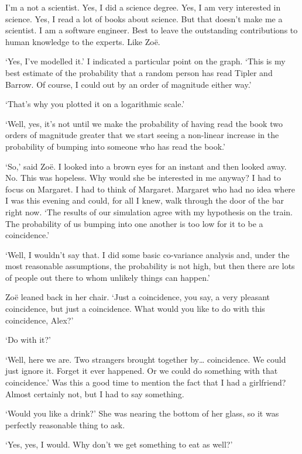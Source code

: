 I'm a not a scientist. Yes, I did a science degree. Yes, I am very
interested in science. Yes, I read a lot of books about science. But
that doesn't make me a scientist. I am a software engineer. Best to
leave the outstanding contributions to human knowledge to the
experts. Like Zoë.

`Yes, I've modelled it.' I indicated a particular point on the
graph. `This is my best estimate of the probability that a random
person has read Tipler and Barrow. Of course, I could out by an
order of magnitude either way.'

`That's why you plotted it on a logarithmic scale.'

`Well, yes, it's not until we make the probability of having read
the book two orders of magnitude greater that we start seeing a
non-linear increase in the probability of bumping into someone who
has read the book.'

`So,' said Zoë. I looked into a brown eyes for an instant and
then looked away. No. This was hopeless. Why would she be interested
in me anyway? I had to focus on Margaret. I had to think of
Margaret. Margaret who had no idea where I was this evening and could, for all I knew, walk through the door of the bar right now. `The results of our simulation agree with my hypothesis on the train. The probability of us bumping into one another is too low for it to be a coincidence.'

`Well, I wouldn't say that. I did some basic co-variance analysis
and, under the most reasonable assumptions, the probability is not
high, but then there are lots of people out there to whom unlikely
things can happen.'

Zoë leaned back in her chair. `Just a coincidence, you say, a
very pleasant coincidence, but just a coincidence. What would you
like to do with this coincidence, Alex?'

`Do with it?'

`Well, here we are. Two strangers brought together by\dots
coincidence. We could just ignore it. Forget it ever happened. Or we
could do something with that coincidence.' Was this a good time to
mention the fact that I had a girlfriend? Almost certainly not, but
I had to say something.

`Would you like a drink?' She was nearing the bottom of her glass,
so it was perfectly reasonable thing to ask.

`Yes, yes, I would. Why don't we get something to eat as well?'


